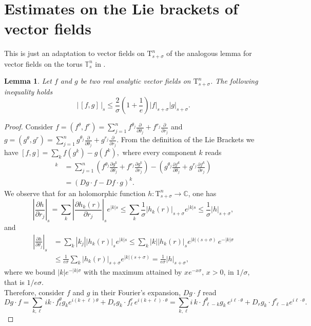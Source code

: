 \documentclass[oneside, 11pt]{amsbook}
\newcommand{\pa}[1]{{\left(#1\right)}}
\newcommand{\sq}[1]{{\left[#1\right]}}
\newcommand{\abs}[1]{{\left|#1\right|}}
\newcommand{\normal}{\mathrm}
\newcommand{\T}{\mathbb{T}}
\newcommand{\C}{\mathbb{C}}
\newcommand{\teta}{\theta}
\newcommand{\base}[1]{{\frac{\partial}{\partial{#1}}}} %
\newcommand{\0}{{(0)}}
\newcommand{\3}{{(3)}}
\newtheorem{lemma}{Lemma}
\numberwithin{equation}{section}
\numberwithin{defn}{section}
\numberwithin{prop}{section}
\numberwithin{cor}{section}
\numberwithin{lemma}{section}
\numberwithin{rmk}{section}
\numberwithin{corollary}{section}
\begin{document}
\section{Estimates on the Lie brackets of vector fields}
This is just an adaptation to vector fields on $\normal{T}^n_{s+\sigma}$ of the analogous lemma for vector fields on the torus $\T^n_s$ in \cite{Poschel:2011}.
\begin{lemma}
	Let $f$ and $g$ be two real analytic vector fields on $\normal{T}^n_{s+\sigma}$. The following inequality holds
	\[\abs{\,\sq{f,g}\,}_s\leq \frac{2}{\sigma}\pa{1+\frac{1}{e}}\abs{f}_{s+\sigma}\abs{ g}_{s+\sigma}.\]
	\label{lemma lie brackets}
\end{lemma}
\begin{proof}
	Consider $f=(f^\teta,f^r) = \sum_{j=1}^n f^{\teta_j}\base{\teta_j} + f^{r_j}\base{r_j}$ and $g=(g^\teta,g^r) = \sum_{j=1}^n g^{\teta_j}\base{\teta_j} + g^{r_j}\base{r_j}$.
	From the definition of the Lie Brackets we have $[{f},{g}] = \sum_k f(g^k) - {g}(f^k),$ where every component $k$ reads
	\begin{align*}
		[f,g]^k &= \sum_{j=1}^n (f^{\teta_j}\frac{\partial g^k}{\partial\teta_j} + f^{r_j}\frac{\partial g^k}{\partial r_j}) - (g^{\teta_j}\frac{\partial f^k}{\partial \teta_j} + g^{r_j}\frac{\partial f^k}{\partial r_j})\\
		&= (Dg\cdot f - Df\cdot g)^k. 
	\end{align*}
	We observe that for an holomorphic function $h: \normal{T}^n_{s+\sigma}\to \C$, one has 
	\[\abs{\frac{\partial h}{\partial r_j}}_s = \sum_k \abs{\frac{\partial h _k(r)}{\partial r_j}}_s e^{\abs{k} s}\leq \sum_k \frac{1}{\sigma}{\abs{h_k(r)}_{s+\sigma}} e^{\abs{k}s}\leq  \frac{1}{\sigma}\abs{h}_{s+\sigma},\]
	and 
	\begin{align*}
		\abs{\frac{\partial h}{\partial \teta_j}}_s &= \sum_k \abs{k_j}\abs{h_k(r)}_s e^{\abs{k}s}\leq \sum_k \abs{k} \abs{h_k(r)}_s e^{\abs{k} (s+\sigma)}\, e^{-\abs{k}\sigma}\\
		& \leq \frac{1}{e\sigma}\sum_k \abs{h_k(r)}_{s+\sigma}e^{\abs{k}(s+\sigma)} = \frac{1}{e\sigma}\abs{h}_{s+\sigma},
	\end{align*}
	where we bound $\abs{k}e^{-\abs{k}\sigma}$ with the maximum attained by $x e^{-x\sigma},\, x > 0$, in $1/\sigma$, that is $1/e\sigma$. \\ Therefore, consider $f$ and $g$ in their Fourier's expansion, $Dg\cdot f$ read
	\[Dg \cdot f = \sum_{k,\ell}\,i {k\cdot f^\theta_\ell}g_k e^{i (k+\ell)\teta} + D_r g_k\cdot f^{r}_\ell\, e^{i (k + \ell)\cdot\teta} = \sum_{k,\ell} i\,k\cdot f^{\teta}_{\ell - k} g_k \,e^{i\ell\cdot\teta}+ D_r g_k\cdot f^{r}_{\ell-k}e^{i\ell\cdot\teta}. \]

\end{proof}
\end{document}
